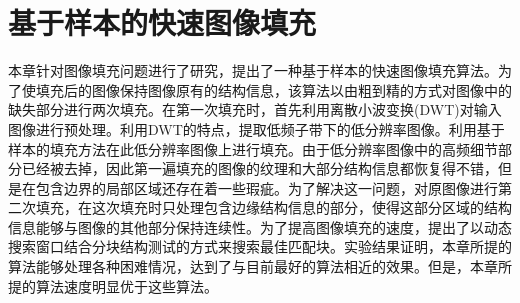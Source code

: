﻿\chapter{基于样本的快速图像填充}
 \label{cha:Inpainting}
 本章针对图像填充问题进行了研究，提出了一种基于样本的快速图像填充算法。为了使填充后的图像保持图像原有的结构信息，该算法以由粗到精的方式对图像中的缺失部分进行两次填充。在第一次填充时，首先利用离散小波变换(DWT)对输入图像进行预处理。利用DWT的特点，提取低频子带下的低分辨率图像。利用基于样本的填充方法在此低分辨率图像上进行填充。由于低分辨率图像中的高频细节部分已经被去掉，因此第一遍填充的图像的纹理和大部分结构信息都恢复得不错，但是在包含边界的局部区域还存在着一些瑕疵。为了解决这一问题，对原图像进行第二次填充，在这次填充时只处理包含边缘结构信息的部分，使得这部分区域的结构信息能够与图像的其他部分保持连续性。为了提高图像填充的速度，提出了以动态搜索窗口结合分块结构测试的方式来搜索最佳匹配块。实验结果证明，本章所提的算法能够处理各种困难情况，达到了与目前最好的算法相近的效果。但是，本章所提的算法速度明显优于这些算法。
